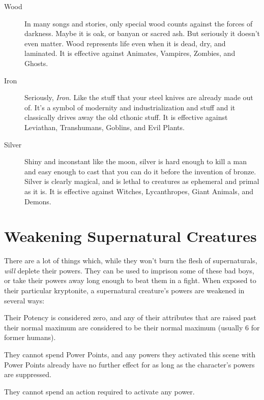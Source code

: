 \begin{description}
\item[Wood] In many songs and stories, only special wood counts against the forces of darkness. Maybe it is oak, or banyan or sacred ash. But seriously it doesn't even matter. Wood represents life even when it is dead, dry, and laminated. It is effective against Animates, Vampires, Zombies, and Ghosts.

\item[Iron] Seriously, \textit{Iron}. Like the stuff that your steel knives are already made out of. It's a symbol of modernity and industrialization and stuff and it classically drives away the old cthonic stuff. It is effective against Leviathan, Transhumans, Goblins, and Evil Plants.

\item[Silver] Shiny and inconstant like the moon, silver is hard enough to kill a man and easy enough to cast that you can do it before the invention of bronze. Silver is clearly magical, and is lethal to creatures as ephemeral and primal as it is. It is effective against Witches, Lycanthropes, Giant Animals, and Demons.
\end{description}

\section{Weakening Supernatural Creatures}

\hspace{\parindent} There are a lot of things which, while they won't burn the flesh of supernaturals, \textit{will} deplete their powers. They can be used to imprison some of these bad boys, or take their powers away long enough to beat them in a fight. When exposed to their particular kryptonite, a supernatural creature's powers are weakened in several ways:

\begin{itemize*}
\item Their Potency is considered zero, and any of their attributes that are raised past their normal maximum are considered to be their normal maximum (usually 6 for former humans).
\item They cannot spend Power Points, and any powers they activated this scene with Power Points already have no further effect for as long as the character's powers are suppressed.
\item They cannot spend an action required to activate any power.
\end{itemize*}

